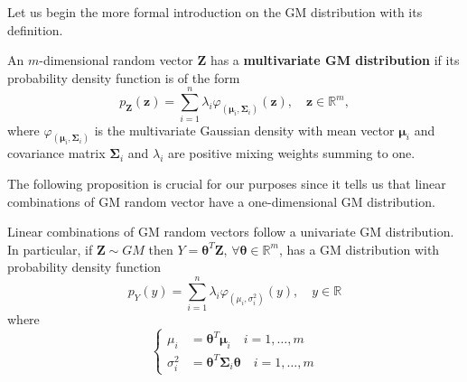 Let us begin the more formal introduction on the GM distribution with its definition.
\begin{definition}[GM distribution]
	An $m$-dimensional random vector $\bm{Z}$ has a \textbf{multivariate GM distribution} if its probability density function is of the form
	\[ p_{\bm{Z}}(\bm{z}) = \sum_{i=1}^{n} \lambda_i \varphi_{(\bm{\mu}_i,\bm{\Sigma}_i)}(\bm{z}), \quad \bm{z} \in \mathbb{R}^m, \] 
	where $\varphi_{(\bm{\mu}_i,\bm{\Sigma}_i)}$ is the multivariate Gaussian density with mean vector $\bm{\mu}_i$ and covariance matrix $\bm{\Sigma}_i$ and $\lambda_i$ are positive mixing weights summing to one.	
\end{definition}
The following proposition is crucial for our purposes since it tells us that linear combinations of GM random vector have a one-dimensional GM distribution.
\begin{proposition}\label{prop:GM_lin_comb}
	Linear combinations of GM random vectors follow a univariate GM distribution. In particular, if $\bm{Z} \sim GM$ then $Y=\bm{\theta}^T \bm{Z}$,  $\forall \bm{\theta} \in \mathbb{R}^m$, has a GM distribution with probability density function \[ p_Y(y) = \sum_{i=1}^{n}\lambda_i \varphi_{(\mu_i,\sigma_i^2)}(y),\quad y \in \mathbb{R} \] where
	\[
	\begin{cases}
	\mu_i & = \bm{\theta}^T \bm{\mu}_i \quad i = 1,\ldots,m \\
	\sigma_i^2 & = \bm{\theta}^T \bm{\Sigma}_i \bm{\theta} \quad i = 1,\ldots,m
	\end{cases} \]
\end{proposition}
